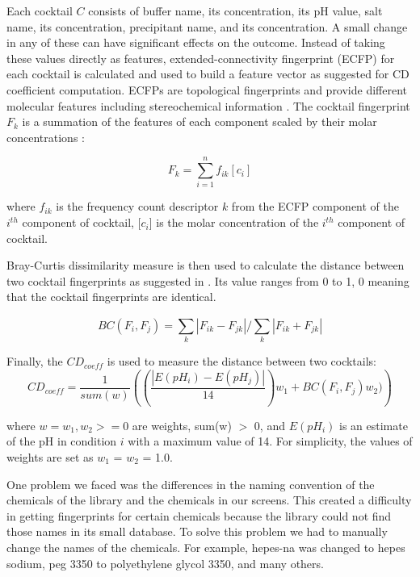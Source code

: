 Each cocktail $C$ consists of buffer name, its concentration, its pH value, salt name, its concentration, precipitant name, and its concentration. A small change in any of these can have significant effects on the outcome. Instead of taking these values directly as features, extended-connectivity fingerprint (ECFP) for each cocktail is calculated and used to build a feature vector as suggested for CD coefficient computation. ECFPs are topological fingerprints and provide different molecular features including stereochemical information \cite{Newman}. The cocktail fingerprint $F_{k}$ is a summation of the features of each component scaled by their molar concentrations \cite{Newman}:

\begin{equation}
F_{k} = \sum_{i=1}^{n}f_{ik}[c_{i}]\label{eq}
\end{equation}

\noindent
where $f_{ik}$ is the frequency count descriptor $k$ from the ECFP component of the $i^{th}$ component of cocktail, [$c_{i}$] is the molar concentration of the $i^{th}$ component of cocktail.

Bray-Curtis dissimilarity measure is then used to calculate the distance between two cocktail fingerprints as suggested in \cite{Newman}. Its value ranges from 0 to 1, 0 meaning that the cocktail fingerprints are identical.

\begin{equation}
BC(F_{i},F_{j}) = \sum_{k}^{ } |F_{ik}-F_{jk}| / \sum_{k}^{ } |F_{ik}+F_{jk}|\label{eq}
\end{equation}

Finally, the $CD_{coeff}$ is used to measure the distance between two cocktails:
\begin{equation}
CD\displaystyle _{coeff} = \frac{1}{sum(w)} \left ( \left ( \frac{|E(pH_{i})-E(pH_{j})|}{14} \right )w_{1} + BC(F_{i},F_{j})w_{2}) \right )
\label{eq}
\end{equation}

\noindent
where $w = w_{1}, w_{2}  >= 0$ are weights, sum(w) $>$ 0, and $E(pH_{i})$ is an estimate of the pH in condition $i$ with a maximum value of 14. For simplicity, the values of weights are set as $w_{1}$ = $w_{2}$ = 1.0.

One problem we faced was the differences in the naming convention of the chemicals of the library and the chemicals in our screens. This created a difficulty in getting fingerprints for certain chemicals because the library could not find those names in its small database. To solve this problem we had to manually change the names of the chemicals. For example, hepes-na was changed to hepes sodium, peg 3350 to polyethylene glycol 3350, and many others.


